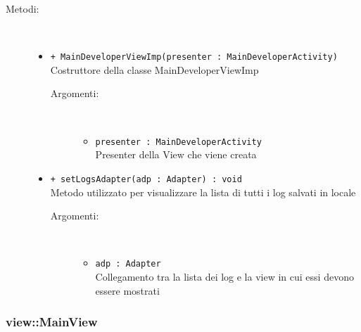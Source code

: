 \documentclass[../DefinizioneDiProdotto.tex]{subfiles}
\begin{document}
\begin{description}
\begin{itemize}
\end{itemize}
\item[Metodi:] \
\begin{itemize}
\item \texttt{+ MainDeveloperViewImp(presenter : MainDeveloperActivity)}\\
Costruttore della classe MainDeveloperViewImp
 \begin{description}
\item[Argomenti:] \
\begin{itemize}
\item \texttt{presenter : MainDeveloperActivity}\\
Presenter della View che viene creata\end{itemize}
\end{description}
\item \texttt{+ setLogsAdapter(adp : Adapter) : void}\\
Metodo utilizzato per visualizzare la lista di tutti i log salvati in locale
 \begin{description}
\item[Argomenti:] \
\begin{itemize}
\item \texttt{adp : Adapter}\\
Collegamento tra la lista dei log e la view in cui essi devono essere mostrati\end{itemize}
\end{description}
\end{itemize}
\end{description}

\subsubsection{view::MainView}
\end{document}
